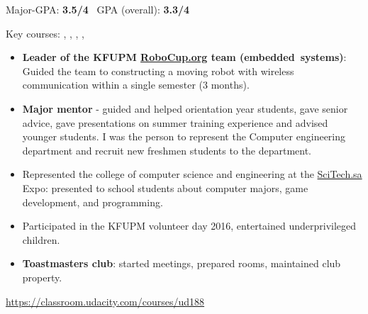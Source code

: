 
\bigskip
{}

{}
\smallskip
Major-GPA: \textbf{3.5/4} \ GPA (overall): \textbf{3.3/4} \\
\smallskip
\begin{small}
Key courses: , , , , 
\end{small}

\smallskip
\begin{itemize}
    \item \textbf{Leader of the KFUPM \href{https://www.robocup.org/}{RoboCup.org} team (embedded~systems)}: Guided the team to constructing a moving robot with wireless communication within a single semester (3 months).
    \item \textbf{Major mentor} - guided and helped orientation year students, gave senior advice, gave presentations on summer training experience and advised younger students. I was the person to represent the Computer engineering department and recruit new freshmen students to the department.
    \item Represented the college of computer science and engineering at the \href{https://www.scitech.sa}{SciTech.sa} Expo: presented to school students about computer majors, game development, and programming.
    \item Participated in the KFUPM volunteer day 2016, entertained underprivileged children.
    \item \textbf{Toastmasters club}: started meetings, prepared rooms, maintained club property.
\end{itemize}



\divider

\href{https://classroom.udacity.com/courses/ud188}{https://classroom.udacity.com/courses/ud188}

